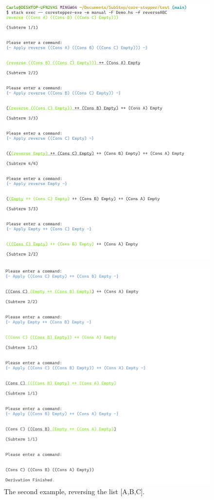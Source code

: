 \begin{figure}
    \includegraphics[width=1\textwidth]{resources/reverse_part_1.PNG}
\end{figure}
\begin{figure}
    \includegraphics[width=1\textwidth]{resources/reverse_part_2.PNG}
    \caption{The second example, reversing the list [A,B,C].}
\end{figure}

